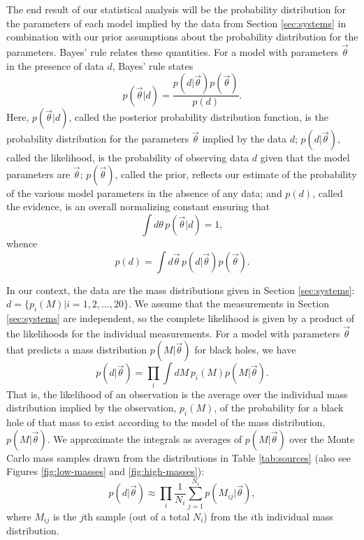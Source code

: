 \documentclass[preprint]{aastex}
\newcommand{\vtheta}{\vec{\theta}}
\begin{document}
The end result of our statistical analysis will be the probability
distribution for the parameters of each model implied by the data from
Section \ref{sec:systems} in combination with our prior assumptions
about the probability distribution for the parameters.  Bayes' rule
relates these quantities.  For a model with parameters $\vtheta$ in
the presence of data $d$, Bayes' rule states
\begin{equation}
  \label{eq:Bayes-rule}
  p(\vtheta | d) = \frac{p(d | \vtheta) p(\vtheta)}{p(d)}.
\end{equation}
Here, $p(\vtheta|d)$, called the posterior probability distribution
function, is the probability distribution for the parameters $\vtheta$
implied by the data $d$; $p(d|\vtheta)$, called the likelihood, is the
probability of observing data $d$ given that the model parameters are
$\vtheta$; $p(\vtheta)$, called the prior, reflects our estimate of the
probability of the various model parameters in the absence of any
data; and $p(d)$, called the evidence, is an overall normalizing
constant ensuring that
\begin{equation}
  \int d\theta\, p(\vtheta|d) = 1,
\end{equation}
whence
\begin{equation}
  \label{eq:evidence-def}
  p(d) = \int d\vtheta\, p(d|\vtheta) p(\vtheta).
\end{equation}

In our context, the data are the mass distributions given in Section
\ref{sec:systems}: $d = \{ p_i(M)| i = 1, 2, \ldots, 20 \}$.  We
assume that the measurements in Section \ref{sec:systems} are
independent, so the complete likelihood is given by a product of the
likelihoods for the individual measurements.  For a model with
parameters $\vtheta$ that predicts a mass distribution $p(M|\vtheta)$
for black holes, we have
\begin{equation}
  \label{eq:likelihood-def}
  p(d|\vtheta) = \prod_i \int dM\, p_i(M) p(M|\vtheta).
\end{equation}
That is, the likelihood of an observation is the average over the
individual mass distribution implied by the observation, $p_i(M)$, of
the probability for a black hole of that mass to exist according to
the model of the mass distribution, $p(M | \vtheta)$.  We approximate
the integrals as averages of $p(M|\vtheta)$ over the Monte Carlo mass
samples drawn from the distributions in Table \ref{tab:sources} (also
see Figures \ref{fig:low-masses} and \ref{fig:high-masses}):
\begin{equation}
  p(d|\vtheta) \approx \prod_i \frac{1}{N_i} \sum_{j = 1}^{N_i} p(M_{ij} | \vtheta),
\end{equation}
where $M_{ij}$ is the $j$th sample (out of a total $N_i$) from the
$i$th individual mass distribution.
\end{document}
